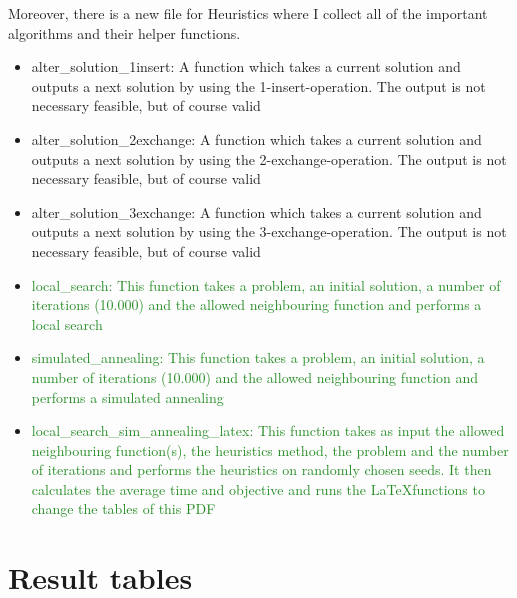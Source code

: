\documentclass[a4paper,11pt]{article}
\theoremstyle{mytheor}
\begin{document}
\clearpage
Moreover, there is a new file for Heuristics where I collect all of the important algorithms and their helper functions.
\begin{itemize}
\item alter\_solution\_1insert: A function which takes a current solution and outputs a next solution by using the 1-insert-operation. The output is not necessary feasible, but of course valid
\item alter\_solution\_2exchange: A function which takes a current solution and outputs a next solution by using the 2-exchange-operation. The output is not necessary feasible, but of course valid
\item alter\_solution\_3exchange: A function which takes a current solution and outputs a next solution by using the 3-exchange-operation. The output is not necessary feasible, but of course valid

\item \textcolor{ForestGreen}{local\_search: This function takes a problem, an initial solution, a number of iterations (10.000) and the allowed neighbouring function and performs a local search}
\item \textcolor{ForestGreen}{simulated\_annealing: This function takes a problem, an initial solution, a number of iterations (10.000) and the allowed neighbouring function and performs a simulated annealing}
\item \textcolor{ForestGreen}{local\_search\_sim\_annealing\_latex: This function takes as input the allowed neighbouring function(s), the heuristics method, the problem and the number of iterations and performs the heuristics on randomly chosen seeds. It then calculates the average time and objective and runs the \LaTeX functions to change the tables of this PDF}
\end{itemize}

\clearpage

\section{Result tables}

\end{document}
